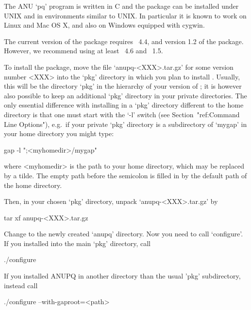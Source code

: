 

The ANU  `pq' program is  written in C  and the package can  be installed
under UNIX  and in environments  similar to UNIX. In particular
it is known to work on Linux and Mac OS X, and also on Windows
equipped with cygwin.

The current version of the  {\ANUPQ}  package  requires  {\GAP}~4.4,  and
version 1.2 of the {\AutPGrp} package. However, we recommend using
at least {\GAP}~4.6 and {\AutPGrp}~1.5.

To install the {\ANUPQ} package, move the file `anupq-<XXX>.tar.gz' for some
version number <XXX> into the  `pkg'  directory  in  which  you  plan  to
install {\ANUPQ}. Usually, this  will  be  the  directory  `pkg'  in  the
hierarchy of your version of {\GAP}; it is  however  also  possible  to
keep an additional `pkg' directory in your private directories. The  only
essential difference  with  installing  {\ANUPQ}  in  a  `pkg'  directory
different to the {\GAP} home directory is that one  must  start  {\GAP}
with the `-l' switch (see Section~"ref:Command  Line  Options"),  e.g.~if
your private `pkg' directory is a subdirectory of `mygap'  in  your  home
directory you might type:

gap -l ";<myhomedir>/mygap"

where <myhomedir> is the  path  to  your  home  directory,  which 
may be replaced  by  a  tilde.  The  empty  path  before  the
semicolon is  filled  in  by  the  default  path  of  the  {\GAP}  home
directory.

Then, in your chosen `pkg' directory, unpack `anupq-<XXX>.tar.gz' by

{}tar xf anupq-<XXX>.tar.gz

Change to the newly created `anupq'  directory.  Now  you  need  to  call
`configure'. If you installed {\ANUPQ} into the  main  `pkg'  directory,
call

\begintt
./configure
\endtt

If you installed ANUPQ in another directory than the usual 'pkg'
subdirectory, instead call

\begintt
./configure --with-gaproot=<path>
\endtt

